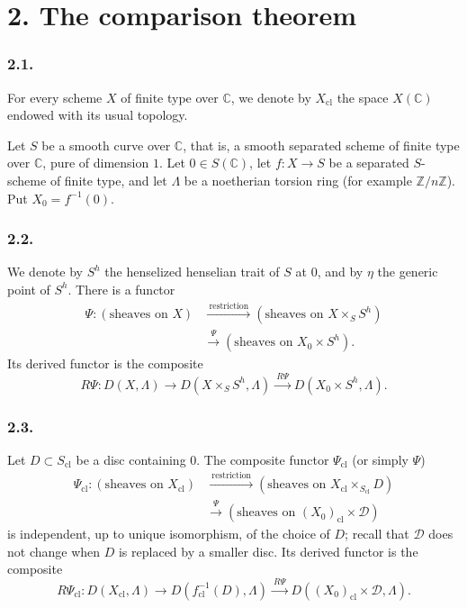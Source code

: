 \section*{2. The comparison theorem}

\subsubsection*{2.1.}
For every scheme $X$ of finite type over $\mathbb C$, we denote by
$X_{\mathrm{cl}}$ the space $X(\mathbb C)$ endowed with its usual
topology.

Let $S$ be a smooth curve over $\mathbb C$, that is, a smooth
separated scheme of finite type over $\mathbb C$, pure of dimension
$1$.  Let $0\in S(\mathbb C)$, let $f:X\longrightarrow S$ be a
separated $S$-scheme of finite type, and let $\Lambda$ be a
noetherian torsion ring (for example $\mathbb Z/n\mathbb Z$).  Put
$X_0=f^{-1}(0)$.

\subsubsection*{2.2.}
We denote by $S^h$ the henselized henselian trait of $S$ at $0$, and
by $\eta$ the generic point of $S^h$.  There is a functor
\[
\begin{aligned}
\Psi:(\text{sheaves on }X)
&\xrightarrow{\ \mathrm{restriction}\ }
(\text{sheaves on }X\times_SS^h)\\
&\xrightarrow{\ \Psi\ }
(\text{sheaves on }X_0\times S^h).
\end{aligned}
\]
Its derived functor is the composite
\[
R\Psi:D(X,\Lambda)
\longrightarrow D(X\times_SS^h,\Lambda)
\xrightarrow{\ R\Psi\ }D(X_0\times S^h,\Lambda).
\]

\subsubsection*{2.3.}
Let $D\subset S_{\mathrm{cl}}$ be a disc containing $0$.  The
composite functor $\Psi_{\mathrm{cl}}$ (or simply $\Psi$)
\[
\begin{aligned}
\Psi_{\mathrm{cl}}:(\text{sheaves on }X_{\mathrm{cl}})
&\xrightarrow{\ \mathrm{restriction}\ }
(\text{sheaves on }X_{\mathrm{cl}}\times_{S_{\mathrm{cl}}}D)\\
&\xrightarrow{\ \Psi\ }
(\text{sheaves on }(X_0)_{\mathrm{cl}}\times\mathcal D)
\end{aligned}
\]
is independent, up to unique isomorphism, of the choice of $D$;
recall that $\mathcal D$ does not change when $D$ is replaced by a
smaller disc.  Its derived functor is the composite
\[
R\Psi_{\mathrm{cl}}:D(X_{\mathrm{cl}},\Lambda)
\longrightarrow D(f_{\mathrm{cl}}^{-1}(D),\Lambda)
\xrightarrow{\ R\Psi\ }
D((X_0)_{\mathrm{cl}}\times\mathcal D,\Lambda).
\]

